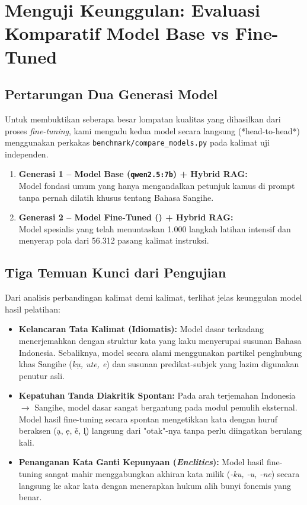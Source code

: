\chapter{Menguji Keunggulan: Evaluasi Komparatif Model Base vs Fine-Tuned}

\section{Pertarungan Dua Generasi Model}
Untuk membuktikan seberapa besar lompatan kualitas yang dihasilkan dari proses \textit{fine-tuning}, kami mengadu kedua model secara langsung (*head-to-head*) menggunakan perkakas \texttt{benchmark/compare\_models.py} pada \StatBenchmarkSamples{} kalimat uji independen.

\begin{enumerate}
    \item \textbf{Generasi 1 -- Model Base (\texttt{qwen2.5:7b}) + Hybrid RAG:} \\
    Model fondasi umum yang hanya mengandalkan petunjuk kamus di prompt tanpa pernah dilatih khusus tentang Bahasa Sangihe.
    \item \textbf{Generasi 2 -- Model Fine-Tuned (\texttt{\StatFinetunedModel}) + Hybrid RAG:} \\
    Model spesialis yang telah menuntaskan 1.000 langkah latihan intensif dan menyerap pola dari 56.312 pasang kalimat instruksi.
\end{enumerate}

\section{Tiga Temuan Kunci dari Pengujian}

\begin{linguisticbox}
Dari analisis perbandingan kalimat demi kalimat, terlihat jelas keunggulan model hasil pelatihan:
\begin{itemize}
    \item \textbf{Kelancaran Tata Kalimat (Idiomatis):} Model dasar terkadang menerjemahkan dengan struktur kata yang kaku menyerupai susunan Bahasa Indonesia. Sebaliknya, model \texttt{\StatFinetunedModel} secara alami menggunakan partikel penghubung khas Sangihe (\textit{k\d{u}, ute, e}) dan susunan predikat-subjek yang lazim digunakan penutur asli.
    \item \textbf{Kepatuhan Tanda Diakritik Spontan:} Pada arah terjemahan Indonesia $\rightarrow$ Sangihe, model dasar sangat bergantung pada modul pemulih eksternal. Model hasil fine-tuning secara spontan mengetikkan kata dengan huruf beraksen (\d{a}, \d{e}, \v{e}, l᷊) langsung dari "otak"-nya tanpa perlu diingatkan berulang kali.
    \item \textbf{Penanganan Kata Ganti Kepunyaan (\textit{Enclitics}):} Model hasil fine-tuning sangat mahir menggabungkan akhiran kata milik (\textit{-ku, -u, -ne}) secara langsung ke akar kata dengan menerapkan hukum alih bunyi fonemis yang benar.
\end{itemize}
\end{linguisticbox}

